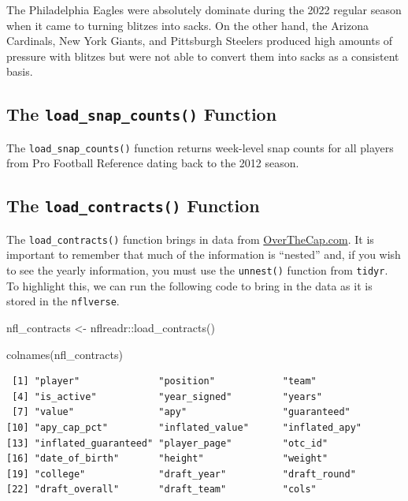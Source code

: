 \documentclass[
  letterpaper,
]{krantz}
\newenvironment{Shaded}{\begin{snugshade}}{\end{snugshade}}
\newcommand{\FunctionTok}[1]{\textcolor[rgb]{0.28,0.35,0.67}{#1}}
\newcommand{\NormalTok}[1]{\textcolor[rgb]{0.00,0.23,0.31}{#1}}
\newcommand{\OtherTok}[1]{\textcolor[rgb]{0.00,0.23,0.31}{#1}}
\newcommand{\SpecialCharTok}[1]{\textcolor[rgb]{0.37,0.37,0.37}{#1}}
\begin{document}
The Philadelphia Eagles were absolutely dominate during the 2022 regular
season when it came to turning blitzes into sacks. On the other hand,
the Arizona Cardinals, New York Giants, and Pittsburgh Steelers produced
high amounts of pressure with blitzes but were not able to convert them
into sacks as a consistent basis.

\hypertarget{the-load_snap_counts-function}{%
\subsection{\texorpdfstring{The \texttt{load\_snap\_counts()}
Function}{The load\_snap\_counts() Function}}\label{the-load_snap_counts-function}}

The \texttt{load\_snap\_counts()} function returns week-level snap
counts for all players from Pro Football Reference dating back to the
2012 season.

\hypertarget{the-load_contracts-function}{%
\subsection{\texorpdfstring{The \texttt{load\_contracts()}
Function}{The load\_contracts() Function}}\label{the-load_contracts-function}}

The \texttt{load\_contracts()} function brings in data from
\href{https://overthecap.com/}{OverTheCap.com}. It is important to
remember that much of the information is ``nested'' and, if you wish to
see the yearly information, you must use the \texttt{unnest()} function
from \texttt{tidyr}. To highlight this, we can run the following code to
bring in the data as it is stored in the \texttt{nflverse}.

\begin{Shaded}
\begin{Highlighting}[]
\NormalTok{nfl\_contracts }\OtherTok{\textless{}{-}}\NormalTok{ nflreadr}\SpecialCharTok{::}\FunctionTok{load\_contracts}\NormalTok{()}

\FunctionTok{colnames}\NormalTok{(nfl\_contracts)}
\end{Highlighting}
\end{Shaded}

\begin{verbatim}
 [1] "player"              "position"            "team"               
 [4] "is_active"           "year_signed"         "years"              
 [7] "value"               "apy"                 "guaranteed"         
[10] "apy_cap_pct"         "inflated_value"      "inflated_apy"       
[13] "inflated_guaranteed" "player_page"         "otc_id"             
[16] "date_of_birth"       "height"              "weight"             
[19] "college"             "draft_year"          "draft_round"        
[22] "draft_overall"       "draft_team"          "cols"               
\end{verbatim}
\end{document}
